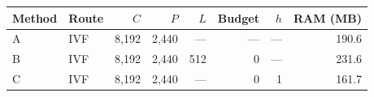 \begin{tabular}{llrrrrrr}
\toprule
Method & Route & $C$ & $P$ & $L$ & Budget & $h$ & RAM (MB) \\
\midrule
A & IVF & 8,192 & 2,440 & --- & --- & --- & 190.6 \\
B & IVF & 8,192 & 2,440 & 512 & 0 & --- & 231.6 \\
C & IVF & 8,192 & 2,440 & --- & 0 & 1 & 161.7 \\
\bottomrule
\end{tabular}
